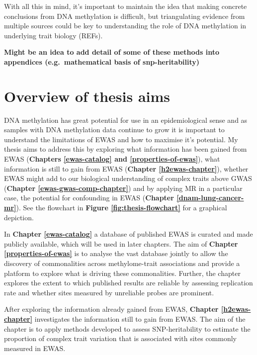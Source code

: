 \documentclass[11pt,twoside]{bristolthesis}
\begin{document}
With all this in mind, it's important to maintain the idea that making concrete conclusions from DNA methylation is difficult, but triangulating evidence from multiple sources could be key to understanding the role of DNA methylation in underlying trait biology (REFs).

\textbf{Might be an idea to add detail of some of these methods into appendices (e.g.~mathematical basis of snp-heritability)}

\hypertarget{overview-of-thesis-aims}{%
\section{Overview of thesis aims}\label{overview-of-thesis-aims}}

DNA methylation has great potential for use in an epidemiological sense and as samples with DNA methylation data continue to grow it is important to understand the limitations of EWAS and how to maximise it's potential. My thesis aims to address this by exploring what information has been gained from EWAS (\textbf{Chapters \ref{ewas-catalog} and \ref{properties-of-ewas}}), what information is still to gain from EWAS (\textbf{Chapter \ref{h2ewas-chapter}}), whether EWAS might add to our biological understanding of complex traits above GWAS (\textbf{Chapter \ref{ewas-gwas-comp-chapter}}) and by applying MR in a particular case, the potential for confounding in EWAS (\textbf{Chapter \ref{dnam-lung-cancer-mr}}). See the flowchart in \textbf{Figure \ref{fig:thesis-flowchart}} for a graphical depiction.

In \textbf{Chapter \ref{ewas-catalog}} a database of published EWAS is curated and made publicly available, which will be used in later chapters. The aim of \textbf{Chapter \ref{properties-of-ewas}} is to analyse the vast database jointly to allow the discovery of commonalities across methylome-trait associations and provide a platform to explore what is driving these commonalities. Further, the chapter explores the extent to which published results are reliable by assessing replication rate and whether sites measured by unreliable probes are prominent.

After exploring the information already gained from EWAS, \textbf{Chapter \ref{h2ewas-chapter}} investigates the information still to gain from EWAS. The aim of the chapter is to apply methods developed to assess SNP-heritability to estimate the proportion of complex trait variation that is associated with sites commonly measured in EWAS.
\end{document}
